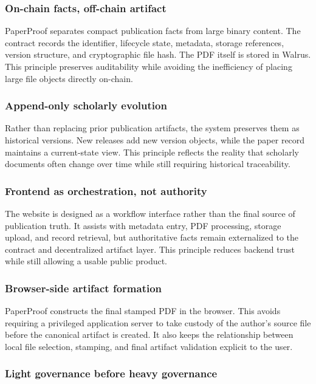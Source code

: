 \documentclass[journal]{IEEEtran}
\begin{document}
\subsubsection{On-chain facts, off-chain artifact}

PaperProof separates compact publication facts from large binary content. The contract records the identifier, lifecycle state, metadata, storage references, version structure, and cryptographic file hash. The PDF itself is stored in Walrus. This principle preserves auditability while avoiding the inefficiency of placing large file objects directly on-chain.

\subsubsection{Append-only scholarly evolution}

Rather than replacing prior publication artifacts, the system preserves them as historical versions. New releases add new version objects, while the paper record maintains a current-state view. This principle reflects the reality that scholarly documents often change over time while still requiring historical traceability.

\subsubsection{Frontend as orchestration, not authority}

The website is designed as a workflow interface rather than the final source of publication truth. It assists with metadata entry, PDF processing, storage upload, and record retrieval, but authoritative facts remain externalized to the contract and decentralized artifact layer. This principle reduces backend trust while still allowing a usable public product.

\subsubsection{Browser-side artifact formation}

PaperProof constructs the final stamped PDF in the browser. This avoids requiring a privileged application server to take custody of the author's source file before the canonical artifact is created. It also keeps the relationship between local file selection, stamping, and final artifact validation explicit to the user.

\subsubsection{Light governance before heavy governance}
\end{document}

